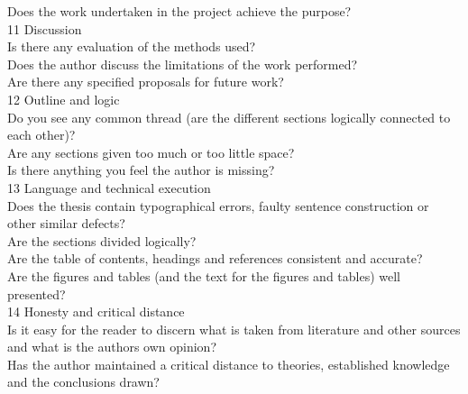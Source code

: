 \documentclass{article}
\begin{document}
Does the work undertaken in the project achieve the purpose?\\

11 Discussion\\

Is there any evaluation of the methods used?\\

Does the author discuss the limitations of the work performed?\\

Are there any specified proposals for future work?\\

12 Outline and logic\\

Do you see any common thread (are the different sections logically connected to each other)?\\

Are any sections given too much or too little space?\\

Is there anything you feel the author is missing?\\

13 Language and technical execution\\

Does the thesis contain typographical errors, faulty sentence construction or other similar defects?\\

Are the sections divided logically?\\

Are the table of contents, headings and references consistent and accurate?\\

Are the figures and tables (and the text for the figures and tables) well presented?\\

14 Honesty and critical distance\\

Is it easy for the reader to discern what is taken from literature and other sources and what is the authors own opinion?\\

Has the author maintained a critical distance to theories, established knowledge and the conclusions drawn?\\
\end{document}
